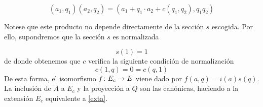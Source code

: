\begin{equation}\label{extop}
(a_1,q_1)(a_2,q_2) = (a_1 + q_1\cdot a_2 + c(q_1,q_2),q_1q_2)
\end{equation}

Notese que este producto no depende directamente de la sección $s$ escogida. Por ello, supondremos que la sección $s$ es normalizada 

\begin{equation}
	s(1) = 1
\end{equation}
de donde obtenemos que $c$ verifica la siguiente condición de normalización
\begin{equation}\label{cocnorm}
	c(1,q) = 0 = c(q,1)
\end{equation}
De esta forma, el isomorfismo $f\colon E_c\to E$ viene dado por $f(a,q) = i(a)s(q)$. La inclusión de $A$ a $E_c$ y la proyección a $Q$ son las canónicas, haciendo a la extensión $E_c$ equivalente a \eqref{exta}.



